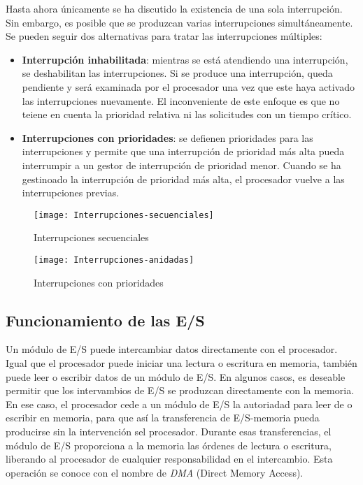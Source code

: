 Hasta ahora únicamente se ha discutido la existencia de una sola interrupción. Sin embargo, es posible que se produzcan varias interrupciones simultáneamente. 
Se pueden seguir dos alternativas para tratar las interrupciones múltiples:

\begin{itemize}
  \item \textbf{Interrupción inhabilitada}: mientras se está atendiendo una interrupción, se deshabilitan las interrupciones. Si se produce una interrupción, queda pendiente y será examinada por el procesador una vez que este haya activado las interrupciones nuevamente.
  El inconveniente de este enfoque es que no teiene en cuenta la prioridad relativa ni las solicitudes con un tiempo crítico. 
  \item \textbf{Interrupciones con prioridades}: se defienen prioridades para las interrupciones y permite que una interrupción de prioridad más alta pueda interrumpir a un gestor de interrupción de prioridad menor. Cuando se ha gestinoado la interrupción de prioridad más alta, el procesador vuelve a las interrupciones previas.
\end{itemize}

\begin{figure}[H]
  \centering
  \texttt{[image: Interrupciones-secuenciales]}
  \caption{Interrupciones secuenciales}
\end{figure}

\begin{figure}[H]
  \centering
  \texttt{[image: Interrupciones-anidadas]}
  \caption{Interrupciones con prioridades}
\end{figure}

\subsection{Funcionamiento de las E/S}

Un módulo de E/S puede intercambiar datos directamente con el procesador. Igual que el procesador puede iniciar una lectura o escritura en memoria, también puede leer o escribir datos de un módulo de E/S.
En algunos casos, es deseable permitir que los intervambios de E/S se produzcan directamente con la memoria. En ese caso, el procesador cede a un módulo de E/S la autoriadad para leer de o escribir en memoria, para que así la transferencia de E/S-memoria pueda producirse sin la intervención  sel procesador.
Durante esas transferencias, el módulo de E/S proporciona a la memoria las órdenes de lectura o escritura, liberando al procesador de cualquier responsabilidad en el intercambio. Esta operación se conoce con el nombre de \textit{DMA} (Direct Memory Access).